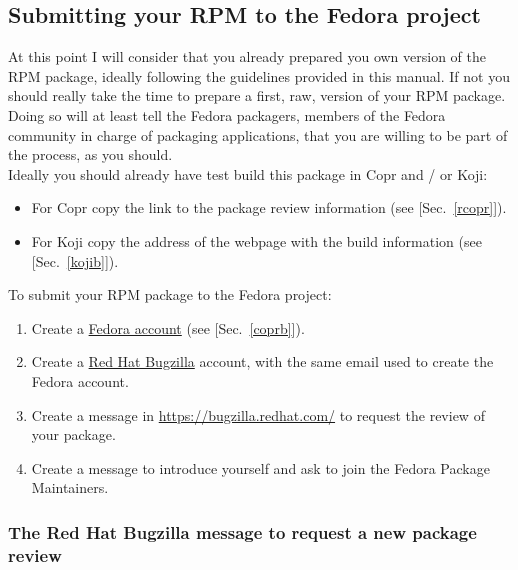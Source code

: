 \subsection{Submitting your RPM to the Fedora project}

At this point I will consider that you already prepared you own version of the RPM package, ideally following the guidelines provided in this manual. 
If not you should really take the time to prepare a first, raw, version of your RPM package. 
Doing so will at least tell the Fedora packagers, members of the Fedora community 
in charge of packaging applications, that you are willing to be part of the process, as you should. \\[0.25cm]
Ideally you should already have test build this package in Copr and / or Koji:
\begin{itemize}
\item For Copr copy the link to the package review information (see [Sec.~\ref{rcopr}]).
\item For Koji copy the address of the webpage with the build information (see [Sec.~\ref{kojib}]). 
\end{itemize}
To submit your RPM package to the Fedora project:
\begin{enumerate}
\item Create a \href{https://accounts.fedoraproject.org/}{Fedora account} (see [Sec.~\ref{coprb}]).
\item Create a \href{https://bugzilla.redhat.com}{Red Hat Bugzilla} account, with the same email used to create the Fedora account. 
\item Create a message in \href{https://bugzilla.redhat.com/}{https://bugzilla.redhat.com/} to request the review of your package. 
\item Create a message to introduce yourself and ask to join the Fedora Package Maintainers.
\end{enumerate}

\subsubsection{The Red Hat Bugzilla message to request a new package review}

